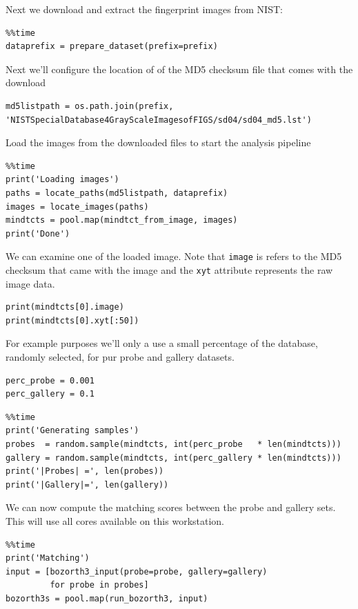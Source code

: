 Next we download and extract the fingerprint images from NIST:

\begin{lstlisting}
%%time
dataprefix = prepare_dataset(prefix=prefix)
\end{lstlisting}

Next we'll configure the location of of the MD5 checksum file that comes
with the download

\begin{lstlisting}
md5listpath = os.path.join(prefix, 'NISTSpecialDatabase4GrayScaleImagesofFIGS/sd04/sd04_md5.lst')
\end{lstlisting}

Load the images from the downloaded files to start the analysis pipeline

\begin{lstlisting}
%%time
print('Loading images')
paths = locate_paths(md5listpath, dataprefix)
images = locate_images(paths)
mindtcts = pool.map(mindtct_from_image, images)
print('Done')
\end{lstlisting}

We can examine one of the loaded image. Note that \texttt{image} is
refers to the MD5 checksum that came with the image and the \texttt{xyt}
attribute represents the raw image data.

\begin{lstlisting}
print(mindtcts[0].image)
print(mindtcts[0].xyt[:50])
\end{lstlisting}

For example purposes we'll only a use a small percentage of the
database, randomly selected, for pur probe and gallery datasets.

\begin{lstlisting}
perc_probe = 0.001
perc_gallery = 0.1
\end{lstlisting}

\begin{lstlisting}
%%time
print('Generating samples')
probes  = random.sample(mindtcts, int(perc_probe   * len(mindtcts)))
gallery = random.sample(mindtcts, int(perc_gallery * len(mindtcts)))
print('|Probes| =', len(probes))
print('|Gallery|=', len(gallery))
\end{lstlisting}

We can now compute the matching scores between the probe and gallery
sets. This will use all cores available on this workstation.

\begin{lstlisting}
%%time
print('Matching')
input = [bozorth3_input(probe=probe, gallery=gallery)
         for probe in probes]
bozorth3s = pool.map(run_bozorth3, input)
\end{lstlisting}

